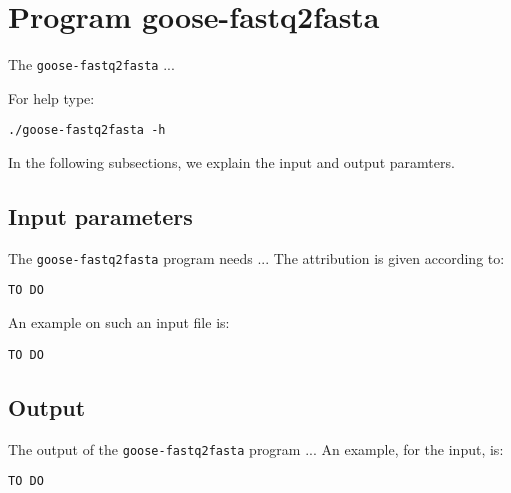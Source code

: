 \section{Program goose-fastq2fasta}
The \texttt{goose-fastq2fasta} ...

For help type:
\begin{lstlisting}
./goose-fastq2fasta -h
\end{lstlisting}
In the following subsections, we explain the input and output paramters.

\subsection{Input parameters}

The \texttt{goose-fastq2fasta} program needs ...
The attribution is given according to:
\begin{lstlisting}
TO DO
\end{lstlisting}

An example on such an input file is:
\begin{lstlisting}
TO DO
\end{lstlisting}

\subsection{Output}
The output of the \texttt{goose-fastq2fasta} program ...
An example, for the input, is:
\begin{lstlisting}
TO DO
\end{lstlisting}
